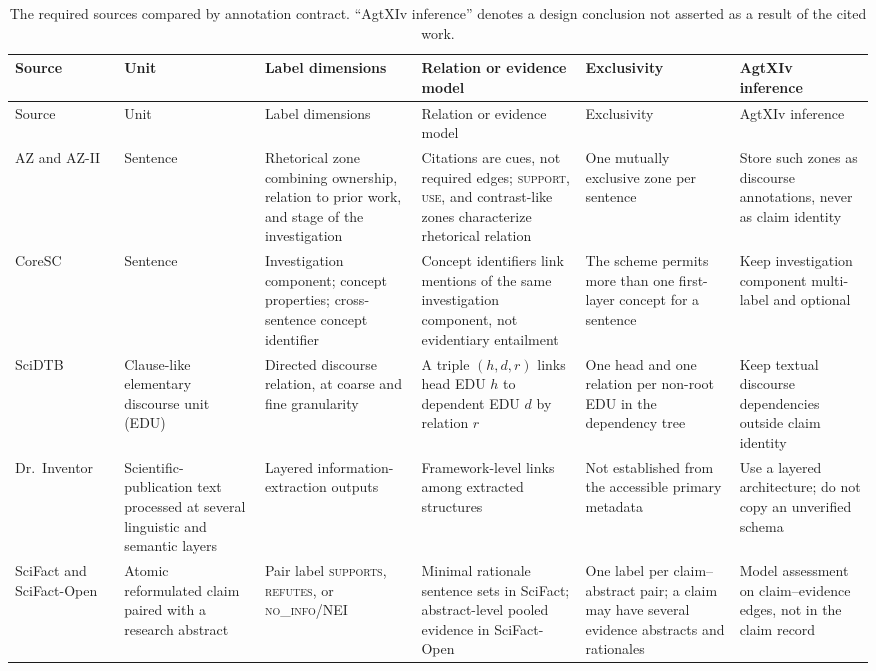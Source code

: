 \small
\begin{longtable}{>{\raggedright\arraybackslash}p{}>{\raggedright\arraybackslash}p{}>{\raggedright\arraybackslash}p{}>{\raggedright\arraybackslash}p{}>{\raggedright\arraybackslash}p{}>{\raggedright\arraybackslash}p{}}
\caption{The required sources compared by annotation contract. ``AgtXIv inference'' denotes a design conclusion not asserted as a result of the cited work.}\label{tab:literature-contracts}\\
\toprule
Source & Unit & Label dimensions & Relation or evidence model & Exclusivity & AgtXIv inference \\
\midrule
\endfirsthead
\toprule
Source & Unit & Label dimensions & Relation or evidence model & Exclusivity & AgtXIv inference \\
\midrule
\endhead
AZ and AZ-II~\cite{teufel1999az,teufel2009azii} & Sentence & Rhetorical zone combining ownership, relation to prior work, and stage of the investigation & Citations are cues, not required edges; \textsc{support}, \textsc{use}, and contrast-like zones characterize rhetorical relation & One mutually exclusive zone per sentence & Store such zones as discourse annotations, never as claim identity \\
CoreSC~\cite{liakata2010coresc,liakata2012coresc} & Sentence & Investigation component; concept properties; cross-sentence concept identifier & Concept identifiers link mentions of the same investigation component, not evidentiary entailment & The scheme permits more than one first-layer concept for a sentence & Keep investigation component multi-label and optional \\
SciDTB~\cite{yang2018scidtb} & Clause-like elementary discourse unit (EDU) & Directed discourse relation, at coarse and fine granularity & A triple $(h,d,r)$ links head EDU $h$ to dependent EDU $d$ by relation $r$ & One head and one relation per non-root EDU in the dependency tree & Keep textual discourse dependencies outside claim identity \\
Dr.~Inventor~\cite{ronzano2015drinventor} & Scientific-publication text processed at several linguistic and semantic layers & Layered information-extraction outputs & Framework-level links among extracted structures & Not established from the accessible primary metadata & Use a layered architecture; do not copy an unverified schema \\
SciFact and SciFact-Open~\cite{wadden2020scifact,wadden2022scifactopen} & Atomic reformulated claim paired with a research abstract & Pair label \textsc{supports}, \textsc{refutes}, or \textsc{no\_info}/NEI & Minimal rationale sentence sets in SciFact; abstract-level pooled evidence in SciFact-Open & One label per claim--abstract pair; a claim may have several evidence abstracts and rationales & Model assessment on claim--evidence edges, not in the claim record \\

\end{longtable}
